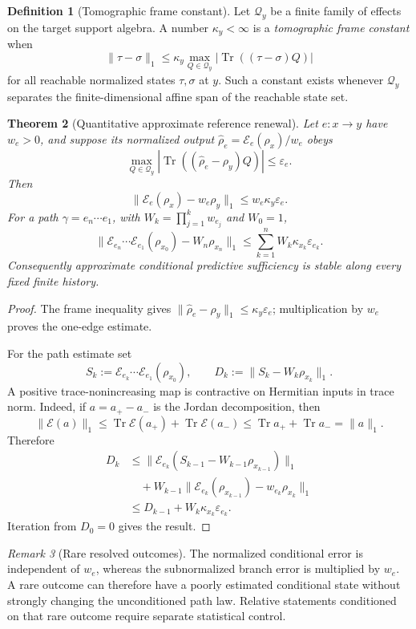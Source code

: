 \documentclass[11pt]{article}
\newtheorem{theorem}{Theorem}[section]
\theoremstyle{definition}
\newtheorem{definition}[theorem]{Definition}
\theoremstyle{remark}
\newtheorem{remark}[theorem]{Remark}
\newcommand{\Tr}{\operatorname{Tr}}
\newcommand{\norm}[1]{\lVert#1\rVert}
\newcommand{\E}{\mathcal E}
\begin{document}
\begin{definition}[Tomographic frame constant]
\label{def:tomographic-frame-constant}
Let $\mathcal Q_y$ be a finite family of effects on the target support algebra.
A number $\kappa_y<\infty$ is a \emph{tomographic frame constant} when
\[
 \norm{\tau-\sigma}_1
 \le
 \kappa_y\max_{Q\in\mathcal Q_y}
 \left|\Tr((\tau-\sigma)Q)\right|
\]
for all reachable normalized states $\tau,\sigma$ at $y$.  Such a constant
exists whenever $\mathcal Q_y$ separates the finite-dimensional affine span of
the reachable state set.
\end{definition}

\begin{theorem}[Quantitative approximate reference renewal]
\label{thm:approximate-reference-renewal}
Let $e:x\to y$ have $w_e>0$, and suppose its normalized output
$\widehat\rho_e=\E_e(\rho_x)/w_e$ obeys
\[
 \max_{Q\in\mathcal Q_y}
 \left|\Tr((\widehat\rho_e-\rho_y)Q)\right|
 \le\varepsilon_e.
\]
Then
\[
 \boxed{
 \norm{\E_e(\rho_x)-w_e\rho_y}_1
 \le w_e\kappa_y\varepsilon_e.}
\]
For a path $\gamma=e_n\cdots e_1$, with
$W_k=\prod_{j=1}^k w_{e_j}$ and $W_0=1$,
\[
 \boxed{
 \norm{
 \E_{e_n}\cdots\E_{e_1}(\rho_{x_0})
 -W_n\rho_{x_n}}_1
 \le
 \sum_{k=1}^n W_k\kappa_{x_k}\varepsilon_{e_k}.}
\]
Consequently approximate conditional predictive sufficiency is stable along
every fixed finite history.
\end{theorem}

\begin{proof}
The frame inequality gives
$\norm{\widehat\rho_e-\rho_y}_1\le\kappa_y\varepsilon_e$; multiplication by
$w_e$ proves the one-edge estimate.

For the path estimate set
\[
 S_k:=\E_{e_k}\cdots\E_{e_1}(\rho_{x_0}),
 \qquad
 D_k:=\norm{S_k-W_k\rho_{x_k}}_1.
\]
A positive trace-nonincreasing map is contractive on Hermitian inputs in trace
norm.  Indeed, if $a=a_+-a_-$ is the Jordan decomposition, then
\[
 \norm{\E(a)}_1
 \le \Tr\E(a_+)+\Tr\E(a_-)
 \le \Tr a_++\Tr a_-=\norm a_1.
\]
Therefore
\[
\begin{aligned}
 D_k
 &\le
 \norm{\E_{e_k}(S_{k-1}-W_{k-1}\rho_{x_{k-1}})}_1\\
 &\quad+
 W_{k-1}
 \norm{\E_{e_k}(\rho_{x_{k-1}})-w_{e_k}\rho_{x_k}}_1\\
 &\le D_{k-1}+W_k\kappa_{x_k}\varepsilon_{e_k}.
\end{aligned}
\]
Iteration from $D_0=0$ gives the result.
\end{proof}

\begin{remark}[Rare resolved outcomes]
The normalized conditional error is independent of $w_e$, whereas the
subnormalized branch error is multiplied by $w_e$.  A rare outcome can
therefore have a poorly estimated conditional state without strongly changing
the unconditioned path law.  Relative statements conditioned on that rare
outcome require separate statistical control.
\end{remark}
\end{document}
